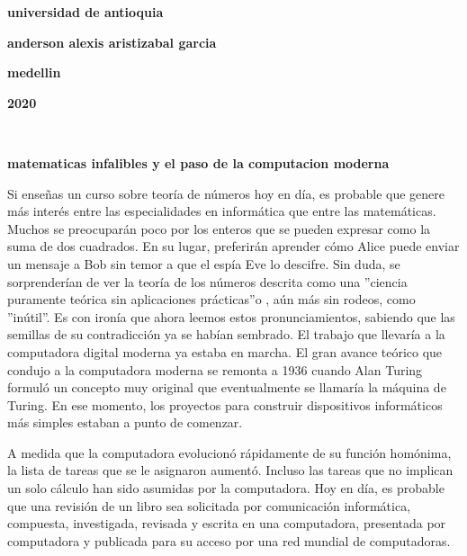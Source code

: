 \documentclass[12pt]{article}
\begin{document}
\begin{center}
\bf{\sc\Huge universidad de antioquia}
\end{center}
\vspace{120pt}
\begin{center}
\bf{\sc\Huge anderson alexis aristizabal garcia }\\
\end{center}
\vspace{200pt}
\begin{center}
\bf{\sc\Huge medellin}
\end{center}
\begin{center}
\bf{\sc\Huge 2020}\\
\end{center}\
\newpage



\begin{center}

\bf{\sc\Huge matematicas infalibles y el paso de la computacion moderna }\\
\end{center}
\large
Si enseñas un curso sobre teoría de números hoy en día, es probable que genere más interés entre las especialidades en informática que entre las matemáticas. Muchos se preocuparán poco por los enteros que se pueden expresar como la suma de dos cuadrados. En su lugar, preferirán aprender cómo Alice puede enviar un mensaje a Bob sin temor a que el espía Eve lo descifre. Sin duda, se sorprenderían de ver la teoría de los números descrita como una ''ciencia puramente teórica sin aplicaciones prácticas''o , aún más sin rodeos, como ''inútil''. Es con ironía que ahora leemos estos pronunciamientos, sabiendo que las semillas de su contradicción ya se habían sembrado. El trabajo que llevaría a la computadora digital moderna ya estaba en marcha. El gran avance teórico que condujo a la computadora moderna se remonta a 1936 cuando Alan Turing formuló un concepto muy original que eventualmente se llamaría la máquina de Turing. En ese momento, los proyectos para construir dispositivos informáticos más simples estaban a punto de comenzar.



\vspace{10PT}
A medida que la computadora evolucionó rápidamente de su función homónima, la lista de tareas que se le asignaron aumentó. Incluso las tareas que no implican un solo cálculo han sido asumidas por la computadora. Hoy en día, es probable que una revisión de un libro sea solicitada por comunicación informática, compuesta, investigada, revisada y escrita en una computadora, presentada por computadora y publicada para su acceso por una red mundial de computadoras. 
\end{document}
